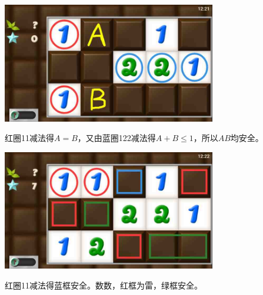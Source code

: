 \subsection{} %
\begin{center}
    \includegraphics[width=0.7\textwidth]{puzzlelow/82-1.jpg}
\end{center}
红圈11减法得$A=B$，又由蓝圈122减法得$A+B\le 1$，所以$AB$均安全。
\begin{center}
    \includegraphics[width=0.7\textwidth]{puzzlelow/82-2.jpg}
\end{center}
红圈11减法得蓝框安全。数数，红框为雷，绿框安全。

